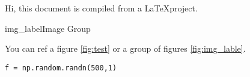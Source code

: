 Hi, this document is compiled from a \LaTeX project\cite{kopka1995guide}.

\begin{cvimggroup}{img_label}{Image Group}
\end{cvimggroup}

You can ref a figure \ref{fig:test} or a group of figures \ref{fig:img_lable}.

\begin{lstlisting}
f = np.random.randn(500,1)
\end{lstlisting}

